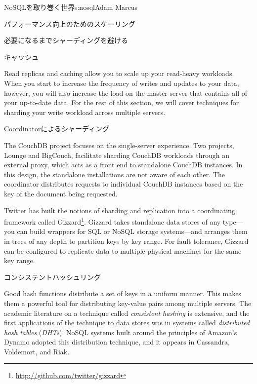 \begin{aosachapter}{NoSQLを取り巻く世界}{s:nosql}{Adam Marcus}
\begin{aosasect1}{パフォーマンス向上のためのスケーリング}
\begin{aosasect2}{必要になるまでシャーディングを避ける}
\begin{aosasect3}{キャッシュ}
\end{aosasect3}

Read replicas and caching allow you to scale up your read-heavy
workloads.  When you start to increase the frequency of writes and
updates to your data, however, you will also increase the load on the
master server that contains all of your up-to-date data.  For the rest
of this section, we will cover techniques for sharding your write
workload across multiple servers.

\end{aosasect2}

\begin{aosasect2}{Coordinatorによるシャーディング}

The CouchDB project focuses on the single-server experience.  Two
projects, Lounge and BigCouch, facilitate sharding CouchDB workloads
through an external proxy, which acts as a front end to standalone
CouchDB instances.  In this design, the standalone installations are
not aware of each other.  The coordinator distributes requests to
individual CouchDB instances based on the key of the document being
requested.

Twitter has built the notions of sharding and replication into a
coordinating framework called Gizzard\footnote{\url{http://github.com/twitter/gizzard}}.  Gizzard takes standalone data stores of any
type---you can build wrappers for SQL or NoSQL storage systems---and
arranges them in trees of any depth to partition keys by key range.
For fault tolerance, Gizzard can be configured to replicate data to
multiple physical machines for the same key range.

\end{aosasect2}

\begin{aosasect2}{コンシステントハッシュリング}

Good hash functions distribute a set of keys in a uniform manner.
This makes them a powerful tool for distributing key-value pairs
among multiple servers.  The academic literature on a technique
called \emph{consistent hashing} is extensive, and the first
applications of the technique to data stores was in systems called
\emph{distributed hash tables} (\emph{DHTs}).  NoSQL systems built
around the principles of Amazon's Dynamo adopted this distribution
technique, and it appears in Cassandra, Voldemort, and Riak.


\end{aosasect2}
\end{aosasect1}
\end{aosachapter}
